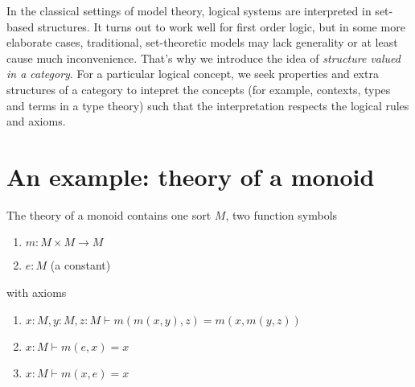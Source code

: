 In the classical settings of model theory, logical systems are interpreted in set-based structures. It turns out to work well for first order logic, but in some more elaborate cases, traditional, set-theoretic models may lack generality or at least cause much inconvenience. That's why we introduce the idea of \textit{structure valued in a category}. For a particular logical concept, we seek properties and extra structures of a category to intepret the concepts (for example, contexts, types and terms in a type theory) such that the interpretation respects the logical rules and axioms.

\iffalse
\section{An example: theory of a monoid}

The theory of a monoid contains one sort $M$, two function symbols
\begin{enumerate}
    \item $m : M\times M\to M$
    \item $e : M$ (a constant)
\end{enumerate}
with axioms
\begin{enumerate}
    \item $x:M,y:M,z:M\vdash m(m(x,y),z)=m(x,m(y,z))$
    \item $x:M\vdash m(e,x)=x$
    \item $x:M\vdash m(x,e)=x$
\end{enumerate}

